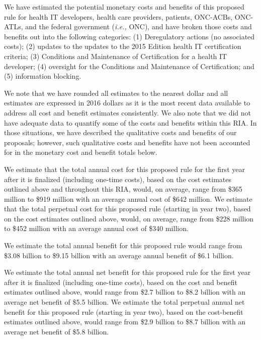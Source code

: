 \documentclass[twoside,11pt]{article}
\begin{document}
          We have estimated the potential monetary costs and benefits of this proposed rule for health IT developers, health care providers, patients, ONC-ACBs, ONC-ATLs, and the federal government (\emph{i.e.,} ONC), and have broken those costs and benefits out into the following categories: (1) Deregulatory actions (no associated costs); (2) updates to the updates to the 2015 Edition health IT certification criteria; (3) Conditions and Maintenance of Certification for a health IT developer; (4) oversight for the Conditions and Maintenance of Certification; and (5) information blocking.


          We note that we have rounded all estimates to the nearest dollar and all estimates are expressed in 2016 dollars as it is the most recent data available to address all cost and benefit estimates consistently. We also note that we did not have adequate data to quantify some of the costs and benefits within this RIA. In those situations, we have described the qualitative costs and benefits of our proposals; however, such qualitative costs and benefits have not been accounted for in the monetary cost and benefit totals below.


          We estimate that the total annual cost for this proposed rule for the first year after it is finalized (including one-time costs), based on the cost estimates outlined above and throughout this RIA, would, on average, range from \$365 million to \$919 million with an average annual cost of \$642 million. We estimate that the total perpetual cost for this proposed rule (starting in year two), based on the cost estimates outlined above, would, on average, range from \$228 million to \$452 million with an average annual cost of \$340 million.


          We estimate the total annual benefit for this proposed rule would range from \$3.08 billion to \$9.15 billion with an average annual benefit of \$6.1 billion.


          We estimate the total annual net benefit for this proposed rule for the first year after it is finalized (including one-time costs), based on the cost and benefit estimates outlined above, would range from \$2.7 billion to \$8.2 billion with an average net benefit of \$5.5 billion. We estimate the total perpetual annual net benefit for this proposed rule (starting in year two), based on the cost-benefit estimates outlined above, would range from \$2.9 billion to \$8.7 billion with an average net benefit of \$5.8 billion.
\end{document}
